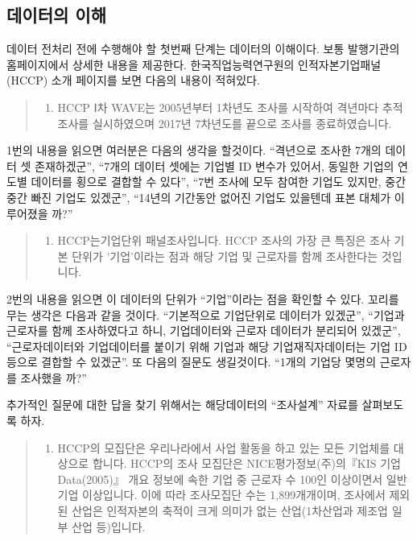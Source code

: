 \documentclass[
]{book}
\providecommand{\tightlist}{%
  \setlength{\itemsep}{0pt}\setlength{\parskip}{0pt}}
\begin{document}
\subsection{데이터의 이해}\label{uxb370uxc774uxd130uxc758-uxc774uxd574}

데이터 전처리 전에 수행해야 할 첫번째 단계는 데이터의 이해이다. 보통 발행기관의 홈페이지에서 상세한 내용을 제공한다. 한국직업능력연구원의 인적자본기업패널(HCCP) 소개 페이지를 보면 다음의 내용이 적혀있다.

\begin{quote}
\begin{enumerate}
\def\labelenumi{\arabic{enumi}.}
\tightlist
\item
  HCCP Ⅰ차 WAVE는 2005년부터 1차년도 조사를 시작하여 격년마다 추적 조사를 실시하였으며 2017년 7차년도를 끝으로 조사를 종료하였습니다.
\end{enumerate}
\end{quote}

1번의 내용을 읽으면 여러분은 다음의 생각을 할것이다. ``격년으로 조사한 7개의 데이터 셋 존재하겠군'', ``7개의 데이터 셋에는 기업별 ID 변수가 있어서, 동일한 기업의 연도별 데이터를 횡으로 결합할 수 있다'', ``7번 조사에 모두 참여한 기업도 있지만, 중간중간 빠진 기업도 있겠군'', ``14년의 기간동안 없어진 기업도 있을텐데 표본 대체가 이루어졌을 까?''

\begin{quote}
\begin{enumerate}
\def\labelenumi{\arabic{enumi}.}
\setcounter{enumi}{1}
\tightlist
\item
  HCCP는기업단위 패널조사입니다. HCCP 조사의 가장 큰 특징은 조사 기본 단위가 '기업'이라는 점과 해당 기업 및 근로자를 함께 조사한다는 것입니다.
\end{enumerate}
\end{quote}

2번의 내용을 읽으면 이 데이터의 단위가 ``기업''이라는 점을 확인할 수 있다. 꼬리를 무는 생각은 다음과 같을 것이다. ``기본적으로 기업단위로 데이터가 있겠군'', ``기업과 근로자를 함께 조사하였다고 하니, 기업데이터와 근로자 데이터가 분리되어 있겠군'', ``근로자데이터와 기업데이터를 붙이기 위해 기업과 해당 기업재직자데이터는 기업 ID 등으로 결합할 수 있겠군''. 또 다음의 질문도 생길것이다. ``1개의 기업당 몇명의 근로자를 조사했을 까?''

추가적인 질문에 대한 답을 찾기 위해서는 해당데이터의 ``조사설계'' 자료를 살펴보도록 하자.

\begin{quote}
\begin{enumerate}
\def\labelenumi{\arabic{enumi}.}
\setcounter{enumi}{2}
\tightlist
\item
  HCCP의 모집단은 우리나라에서 사업 활동을 하고 있는 모든 기업체를 대상으로 합니다. HCCP의 조사 모집단은 NICE평가정보(주)의『KIS 기업 Data(2005)』 개요 정보에 속한 기업 중 근로자 수 100인 이상이면서 일반 기업 이상입니다. 이에 따라 조사모집단 수는 1,899개개이며, 조사에서 제외된 산업은 인적자본의 축적이 크게 의미가 없는 산업(1차산업과 제조업 일부 산업 등)입니다.
\end{enumerate}
\end{quote}
\end{document}
